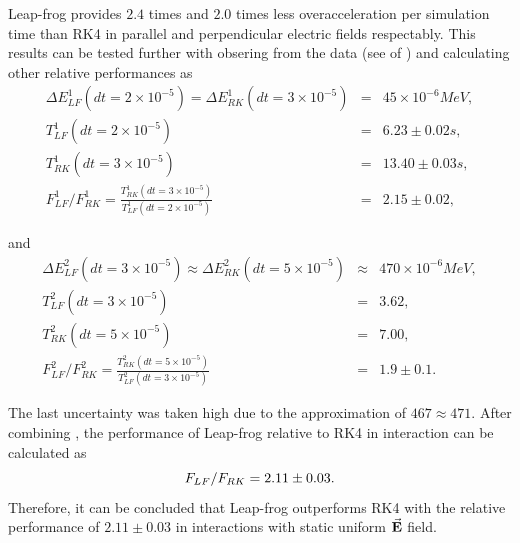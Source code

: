 \documentclass[a4paper,oneside,12pt]{report}
\numberwithin{equation}{chapter}
\begin{document}
{\vspace{-10pt}
Leap-frog provides $2.4$ times and $2.0$ times less overacceleration per simulation time than 
RK4 in parallel and perpendicular electric fields respectably.
This results can be tested further with obsering from the data (see  of )
and calculating other relative performances as
\vspace{-17pt}\begin{eqnarray} \label{eq:f_lf_rk_3}
    \Delta E_{LF}^1 (dt=2 \times 10^{-5}) = \Delta E_{RK}^1 (dt=3 \times 10^{-5}) &=& 45 \times 10^{-6} MeV, \\
    T_{LF}^1(dt=2 \times 10^{-5})  &=& 6.23 \pm 0.02 s, \\ %
    T_{RK}^1(dt=3 \times 10^{-5})  &=& 13.40 \pm 0.03 s, \\ %
    F_{LF}^1/F_{RK}^1 = \frac{T_{RK}^1(dt=3 \times 10^{-5})}{T_{LF}^1(dt=2 \times 10^{-5})} &=& 2.15 \pm 0.02,
\end{eqnarray}

\vspace{-31pt}
\noindent
and
\vspace{-20pt}
\begin{eqnarray} \label{eq:f_lf_rk_4}
    \Delta E_{LF}^2 (dt=3 \times 10^{-5}) \approx \Delta E_{RK}^2 (dt=5 \times 10^{-5}) &\approx& 470 \times 10^{-6} MeV, \\
    T_{LF}^2(dt=3 \times 10^{-5})  &=& 3.62, \\ %
    T_{RK}^2(dt=5 \times 10^{-5})  &=& 7.00, \\ %
    F_{LF}^2/F_{RK}^2 = \frac{T_{RK}^2(dt=5 \times 10^{-5})}{T_{LF}^2(dt=3 \times 10^{-5})} &=& 1.9 \pm 0.1.
\end{eqnarray}

\vspace{-10pt}
The last uncertainty was taken high due to the approximation of $467 \approx 471$. After combining ,
the performance of Leap-frog relative to RK4 in \eE interaction can be calculated as
\vspace{-20pt}\begin{equation}\label{eq:lf_rk_eE_relative_performance}
    F_{LF}/F_{RK} = 2.11 \pm 0.03.
\vspace{-20pt}\end{equation}
Therefore, it can be concluded that Leap-frog outperforms RK4 with the relative performance of $2.11 \pm 0.03$ in \eE interactions with static uniform $\vec{\textbf{E}}$ field. 

}
\end{document}
